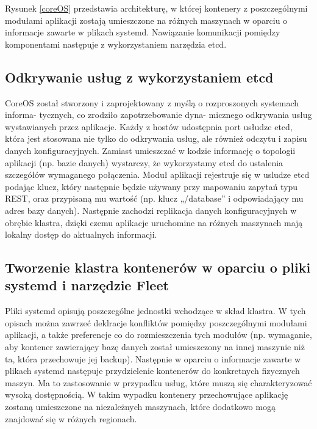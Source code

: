 Rysunek \ref{coreOS} przedstawia architekturę, w której kontenery z poszczególnymi modułami aplikacji zostają umieszczone na różnych maszynach w oparciu o informacje zawarte w plikach systemd. Nawiązanie komunikacji pomiędzy komponentami następuje z wykorzystaniem narzędzia etcd.

\subsection{Odkrywanie usług z wykorzystaniem etcd}

CoreOS został stworzony i zaprojektowany z myślą o rozproszonych systemach informa- tycznych, co zrodziło zapotrzebowanie dyna- micznego odkrywania usług wystawianych przez aplikacje. Każdy z hostów udostępnia port usłudze etcd, która jest stosowana nie tylko do odkrywania usług, ale również odczytu i zapisu danych konfiguracyjnych. Zamiast umieszczać w kodzie informację o topologii aplikacji (np. bazie danych) wystarczy, że wykorzystamy etcd do ustalenia szczegółów wymaganego połączenia. Moduł aplikacji rejestruje się w usludze etcd podając klucz, który następnie będzie używany przy mapowaniu zapytań typu REST, oraz przypisaną mu wartość (np. klucz „/database” i odpowiadający mu adres bazy danych). Następnie zachodzi replikacja danych konfiguracyjnych w obrębie klastra, dzięki czemu aplikacje uruchomine na różnych maszynach mają lokalny dostęp do aktualnych informacji.

\subsection{Tworzenie klastra kontenerów w oparciu o pliki systemd i narzędzie Fleet}

Pliki systemd opisują poszczególne jednostki wchodzące w skład klastra. W tych opisach można zawrzeć deklracje konfliktów pomiędzy poszczególnymi modułami aplikacji, a także preferencje co do rozmieszczenia tych modułów (np. wymaganie, aby kontener zawierający bazę danych został umieszczony na innej maszynie niż ta, która przechowuje jej backup). Następnie w oparciu o informacje zawarte w plikach systemd następuje przydzielenie kontenerów do konkretnych fizycznych maszyn. Ma to zastosowanie w przypadku usług, które muszą się charakteryzować wysoką dostępnością. W takim wypadku kontenery przechowujące aplikację zostaną umieszczone na niezależnych maszynach, które dodatkowo mogą znajdować się w różnych regionach.